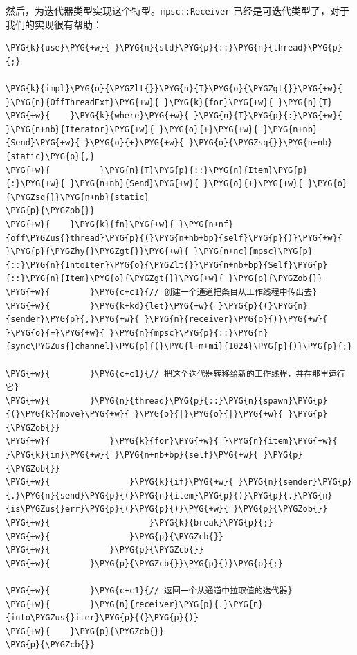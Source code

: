 然后，为迭代器类型实现这个特型。\texttt{mpsc::Receiver} 已经是可迭代类型了，对于我们的实现很有帮助：

\begin{Verbatim}[commandchars=\\\{\},breaklines=true,breakanywhere=true,fontsize=\codefont,xleftmargin=17bp]
\PYG{k}{use}\PYG{+w}{ }\PYG{n}{std}\PYG{p}{::}\PYG{n}{thread}\PYG{p}{;}

\PYG{k}{impl}\PYG{o}{\PYGZlt{}}\PYG{n}{T}\PYG{o}{\PYGZgt{}}\PYG{+w}{ }\PYG{n}{OffThreadExt}\PYG{+w}{ }\PYG{k}{for}\PYG{+w}{ }\PYG{n}{T}
\PYG{+w}{    }\PYG{k}{where}\PYG{+w}{ }\PYG{n}{T}\PYG{p}{:}\PYG{+w}{ }\PYG{n+nb}{Iterator}\PYG{+w}{ }\PYG{o}{+}\PYG{+w}{ }\PYG{n+nb}{Send}\PYG{+w}{ }\PYG{o}{+}\PYG{+w}{ }\PYG{o}{\PYGZsq{}}\PYG{n+nb}{static}\PYG{p}{,}
\PYG{+w}{          }\PYG{n}{T}\PYG{p}{::}\PYG{n}{Item}\PYG{p}{:}\PYG{+w}{ }\PYG{n+nb}{Send}\PYG{+w}{ }\PYG{o}{+}\PYG{+w}{ }\PYG{o}{\PYGZsq{}}\PYG{n+nb}{static}
\PYG{p}{\PYGZob{}}
\PYG{+w}{    }\PYG{k}{fn}\PYG{+w}{ }\PYG{n+nf}{off\PYGZus{}thread}\PYG{p}{(}\PYG{n+nb+bp}{self}\PYG{p}{)}\PYG{+w}{ }\PYG{p}{\PYGZhy{}\PYGZgt{}}\PYG{+w}{ }\PYG{n+nc}{mpsc}\PYG{p}{::}\PYG{n}{IntoIter}\PYG{o}{\PYGZlt{}}\PYG{n+nb+bp}{Self}\PYG{p}{::}\PYG{n}{Item}\PYG{o}{\PYGZgt{}}\PYG{+w}{ }\PYG{p}{\PYGZob{}}
\PYG{+w}{        }\PYG{c+c1}{// 创建一个通道把条目从工作线程中传出去}
\PYG{+w}{        }\PYG{k+kd}{let}\PYG{+w}{ }\PYG{p}{(}\PYG{n}{sender}\PYG{p}{,}\PYG{+w}{ }\PYG{n}{receiver}\PYG{p}{)}\PYG{+w}{ }\PYG{o}{=}\PYG{+w}{ }\PYG{n}{mpsc}\PYG{p}{::}\PYG{n}{sync\PYGZus{}channel}\PYG{p}{(}\PYG{l+m+mi}{1024}\PYG{p}{)}\PYG{p}{;}

\PYG{+w}{        }\PYG{c+c1}{// 把这个迭代器转移给新的工作线程，并在那里运行它}
\PYG{+w}{        }\PYG{n}{thread}\PYG{p}{::}\PYG{n}{spawn}\PYG{p}{(}\PYG{k}{move}\PYG{+w}{ }\PYG{o}{|}\PYG{o}{|}\PYG{+w}{ }\PYG{p}{\PYGZob{}}
\PYG{+w}{            }\PYG{k}{for}\PYG{+w}{ }\PYG{n}{item}\PYG{+w}{ }\PYG{k}{in}\PYG{+w}{ }\PYG{n+nb+bp}{self}\PYG{+w}{ }\PYG{p}{\PYGZob{}}
\PYG{+w}{                }\PYG{k}{if}\PYG{+w}{ }\PYG{n}{sender}\PYG{p}{.}\PYG{n}{send}\PYG{p}{(}\PYG{n}{item}\PYG{p}{)}\PYG{p}{.}\PYG{n}{is\PYGZus{}err}\PYG{p}{(}\PYG{p}{)}\PYG{+w}{ }\PYG{p}{\PYGZob{}}
\PYG{+w}{                    }\PYG{k}{break}\PYG{p}{;}
\PYG{+w}{                }\PYG{p}{\PYGZcb{}}
\PYG{+w}{            }\PYG{p}{\PYGZcb{}}
\PYG{+w}{        }\PYG{p}{\PYGZcb{}}\PYG{p}{)}\PYG{p}{;}

\PYG{+w}{        }\PYG{c+c1}{// 返回一个从通道中拉取值的迭代器}
\PYG{+w}{        }\PYG{n}{receiver}\PYG{p}{.}\PYG{n}{into\PYGZus{}iter}\PYG{p}{(}\PYG{p}{)}
\PYG{+w}{    }\PYG{p}{\PYGZcb{}}
\PYG{p}{\PYGZcb{}}
\end{Verbatim}

